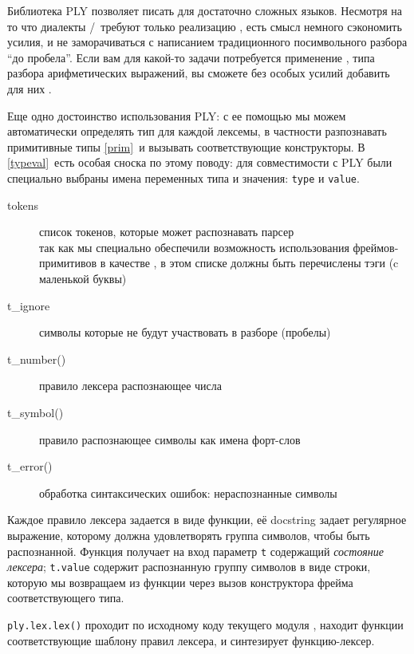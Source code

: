 \label{ply}

Библиотека PLY позволяет писать  для достаточно сложных языков.
Несмотря на то что диалекты \F/\pyf\ требуют только реализацию ,
есть смысл немного сэкономить усилия, и не заморачиваться с написанием
традиционного посимвольного разбора ``до пробела''. Если вам для какой-то задачи
потребуется применение , типа разбора арифметических
выражений, вы сможете без особых усилий добавить для них .

Еще одно достоинство использования PLY: с ее помощью мы можем автоматически
определять тип для каждой лексемы, в частности разпознавать примитивные типы
\ref{prim}\ и вызывать соответствующие конструкторы. В \ref{typeval}\ есть
особая сноска по этому поводу: для совместимости с PLY были специально выбраны
имена переменных типа и значения: \verb|type| и \verb|value|.

\clearpage
{}

\clearpage
\begin{description}%
\item[tokens] список токенов, которые может распознавать парсер\\
так как мы специально обеспечили возможность использования фрей\-мов-примитивов
в качестве , в этом списке должны быть перечислены тэги (c
маленькой буквы)
\item[t\_ignore] символы которые не будут участвовать в разборе (пробелы) 
\item[t\_number()] правило лексера распознающее числа
\item[t\_symbol()] правило распознающее символы как имена форт-слов
\item[t\_error()] обработка синтаксических ошибок: нераспознанные символы
\end{description}

\clearpage
\noindent
Каждое правило лексера задается в виде функции, её docstring задает регулярное
выражение, которому должна удовлетворять группа символов, чтобы быть
распознанной. Функция получает на вход параметр \verb|t| содержащий
\textit{состояние лексера}; \verb|t.value| содержит распознанную группу символов
в виде строки, которую мы возвращаем из функции через вызов конструктора фрейма
соответствующего типа.

\bigskip
\noindent
\verb|ply.lex.lex()| проходит по исходному коду текущего модуля \py, находит
функции соответствующие шаблону правил лексера, и синтезирует функцию-лексер.

\medskip
{}
